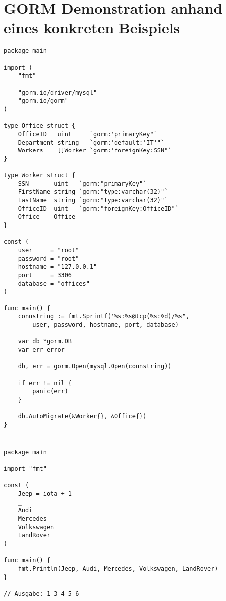 \section[GORM Demonstration anhand eines konkreten Beispiels]{\large GORM Demonstration anhand eines konkreten Beispiels}
\vspace{-\baselineskip}
\begin{lstlisting}[style=goRaw,caption={\centering Ausführlicher Programmcode zu Listing \ref{lst:tech:gorm:ex1} (\nameref{lst:tech:gorm:ex1})}]
package main

import (
    "fmt"

    "gorm.io/driver/mysql"
    "gorm.io/gorm"
)

type Office struct {
    OfficeID   uint     `gorm:"primaryKey"`
    Department string   `gorm:"default:'IT'"`
    Workers    []Worker `gorm:"foreignKey:SSN"`
}

type Worker struct {
    SSN       uint   `gorm:"primaryKey"`
    FirstName string `gorm:"type:varchar(32)"`
    LastName  string `gorm:"type:varchar(32)"`
    OfficeID  uint   `gorm:"foreignKey:OfficeID"`
    Office    Office
}

const (
    user     = "root"
    password = "root"
    hostname = "127.0.0.1"
    port     = 3306
    database = "offices"
)

func main() {
    connstring := fmt.Sprintf("%s:%s@tcp(%s:%d)/%s", 
        user, password, hostname, port, database)
      
    var db *gorm.DB
    var err error

    db, err = gorm.Open(mysql.Open(connstring))
    
    if err != nil {
        panic(err)
    }
    
    db.AutoMigrate(&Worker{}, &Office{})
}
\end{lstlisting}

\newpage
\section{}
\begin{lstlisting}[style=goRaw,caption={\centering Ausführlicher Programmcode zu Listing \ref{lst:tech:go:enum:ex1} (\nameref{lst:tech:go:enum:ex1})}]
package main

import "fmt"

const (
    Jeep = iota + 1
    _
    Audi
    Mercedes
    Volkswagen
    LandRover
)

func main() {
    fmt.Println(Jeep, Audi, Mercedes, Volkswagen, LandRover) 
}

// Ausgabe: 1 3 4 5 6
\end{lstlisting}

